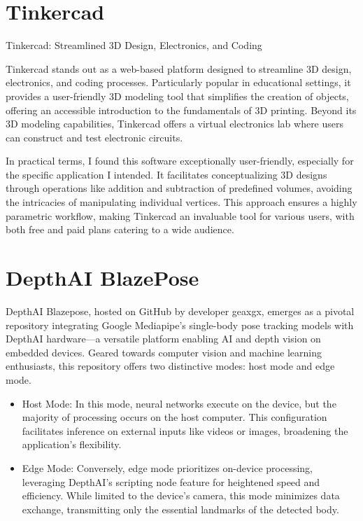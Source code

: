 \documentclass{Configuration_Files/PoliMi3i_thesis}
\begin{document}
\section{Tinkercad}


Tinkercad: Streamlined 3D Design, Electronics, and Coding

Tinkercad stands out as a web-based platform designed to streamline 3D design, electronics, and coding processes. Particularly popular in educational settings, it provides a user-friendly 3D modeling tool that simplifies the creation of objects, offering an accessible introduction to the fundamentals of 3D printing. Beyond its 3D modeling capabilities, Tinkercad offers a virtual electronics lab where users can construct and test electronic circuits.

In practical terms, I found this software exceptionally user-friendly, especially for the specific application I intended. It facilitates conceptualizing 3D designs through operations like addition and subtraction of predefined volumes, avoiding the intricacies of manipulating individual vertices. This approach ensures a highly parametric workflow, making Tinkercad an invaluable tool for various users, with both free and paid plans catering to a wide audience.

 

\section{DepthAI BlazePose}

DepthAI Blazepose, hosted on GitHub by developer geaxgx, emerges as a pivotal repository integrating Google Mediapipe's single-body pose tracking models with DepthAI hardware—a versatile platform enabling AI and depth vision on embedded devices. Geared towards computer vision and machine learning enthusiasts, this repository offers two distinctive modes: host mode and edge mode.

\begin{itemize}
    \item Host Mode: In this mode, neural networks execute on the device, but the majority of processing occurs on the host computer. This configuration facilitates inference on external inputs like videos or images, broadening the application's flexibility.
    \item Edge Mode: Conversely, edge mode prioritizes on-device processing, leveraging DepthAI's scripting node feature for heightened speed and efficiency. While limited to the device's camera, this mode minimizes data exchange, transmitting only the essential landmarks of the detected body.
\end{itemize}
\end{document}

